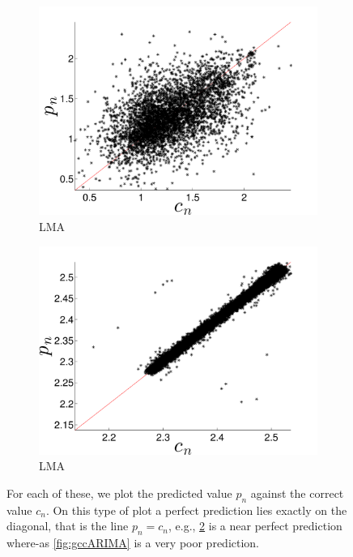 \begin{figure}[htbp]
\begin{subfigure}{0.49\textwidth}
    \includegraphics[width=\textwidth]{figs/gccLMAForecast}
    \caption{\gcc LMA}
    \label{fig:gccLMA}
  \end{subfigure}  
    \begin{subfigure}{0.49\textwidth}
    \includegraphics[width=\textwidth]{figs/colLMAForecast}
    \caption{\col LMA}
    \label{fig:colLMA}
  \end{subfigure}

  
   \caption{
For each of these, we plot the predicted value $p_n$ against the correct value $c_n$. On this type of plot a perfect prediction lies exactly on the diagonal, that is the line $p_n = c_n$, e.g., \ref{fig:colLMA} is a near perfect prediction where-as \ref{fig:gccARIMA} is a very poor prediction. }\label{fig:gcc_vs_col}  
\end{figure} 
